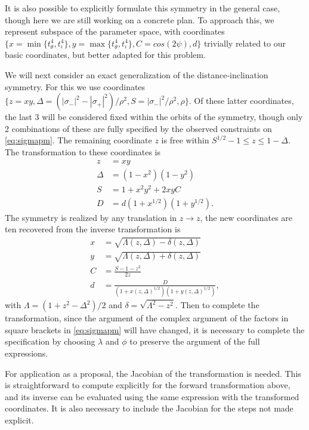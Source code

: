 \documentclass[aps,showpacs,twocolumn,prd,superscriptaddress,nofootinbib]{revtex4}
\begin{document}
It is also possible to explicitly formulate this symmetry in the general case, though here we are still working on a concrete plan.
To approach this, we represent subspace of the parameter space, with coordinates $\{x=\min\{t^4_\theta,t^4_\iota\},y=\max\{t^4_\theta,t^4_\iota\},C=cos(2\psi),d\}$ trivially related to our basic coordinates, but better adapted for this problem.

We will next consider an exact generalization of the distance-inclination symmetry. For this we use coordinates $\{z=xy,\Delta=(|\sigma_-|^2-|\sigma_+|^2)/\rho^2,S=|\sigma_-|^2/\rho^2,\rho\}$.  Of these latter coordinates, the last 3 will be considered fixed within the orbits of the symmetry, though only 2 combinations of these are fully specified by the observed constraints on \eqref{eq:sigmapm}. The remaining coordinate $z$ is free within $S^{1/2}-1\leq z\leq 1-\Delta$. The transformation to these coordinates is
\begin{align}
  z&=xy\\
  \Delta&=(1-x^2)(1-y^2)\\
  S&=1+x^2y^2+2xyC\\
  D&=d(1+x^{1/2})(1+y^{1/2}).
\end{align}
The symmetry is realized by any translation in $z\rightarrow z$, the new coordinates are ten recovered from the inverse transformation is 
\begin{align}
  x&=\sqrt{\Lambda(z,\Delta)-\delta(z,\Delta)}\\
  y&=\sqrt{\Lambda(z,\Delta)+\delta(z,\Delta)}\\
  C&=\frac{S-1-z^2}{2z}\\
  d&=\frac D{(1+x(z,\Delta)^{1/2})(1+y(z,\Delta)^{1/2})},
\end{align}
with $\Lambda=(1+z^2-\Delta^2)/2$ and $\delta=\sqrt{\Lambda^2-z^2}$.
Then to complete the transformation, since the argument of the complex argument of the factors in square brackets in \eqref{eq:sigmapm} will have changed, it is necessary to complete the specification by choosing $\lambda$ and $\phi$ to preserve the argument of the full expressions.

For application as a proposal, the Jacobian of the transformation is needed.  This is straightforward to compute explicitly for the forward transformation above, and its inverse can be evaluated using the same expression with the transformed coordinates.  It is also necessary to include the Jacobian for the steps not made explicit.
\end{document}
